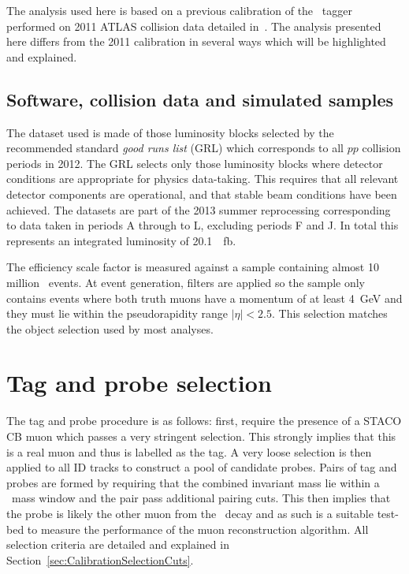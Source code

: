 The analysis used here is based on a previous calibration of the \xsm\ tagger performed on 2011 ATLAS collision data detailed in~\cite{Calibration:MattThesis}. The analysis presented here differs from the 2011 calibration in several ways which will be highlighted and explained.

\subsection*{Software, collision data and simulated samples}

The dataset used is made of those luminosity blocks selected by the recommended standard \emph{good runs list} (GRL) which corresponds to all $pp$ collision periods in 2012. The GRL selects only those luminosity blocks where detector conditions are appropriate for physics data-taking. This requires that all relevant detector components are operational, and that stable beam conditions have been achieved. The datasets are part of the 2013 summer reprocessing corresponding to data taken in periods A through to L, excluding periods F and J. In total this represents an integrated luminosity of \SI{20.1}{\per\femto\barn}. 

The efficiency scale factor is measured against a sample containing almost 10 million \JMu\ events. At event generation, filters are applied so the sample only contains events where both truth muons have a momentum of at least \SI{4}{\GeV} and they must lie within the pseudorapidity range $|\eta|<2.5$. This selection matches the object selection used by most analyses. 

\section{Tag and probe selection}\label{sec:CalibrationSelection}

The tag and probe procedure is as follows: first, require the presence of a STACO CB muon which passes a very stringent selection. This strongly implies that this is a real muon and thus is labelled as the tag. A very loose selection is then applied to all ID tracks to construct a pool of candidate probes. Pairs of tag and probes are formed by requiring that the combined invariant mass lie within a \jpsi\ mass window and the pair pass additional pairing cuts. This then implies that the probe is likely the other muon from the \jpsi\ decay and as such is a suitable test-bed to measure the performance of the muon reconstruction algorithm. All selection criteria are detailed and explained in Section~\ref{sec:CalibrationSelectionCuts}.


